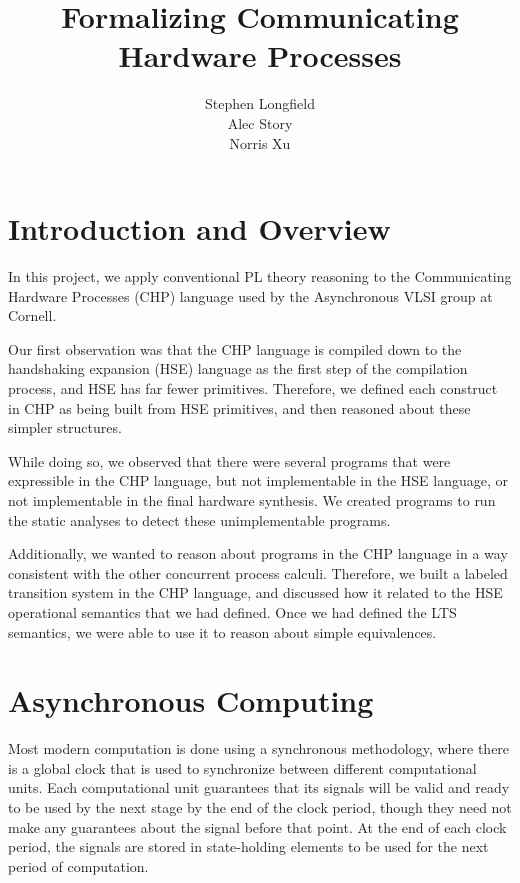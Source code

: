 \documentclass[times, 10pt]{article}
\begin{document}
\title{Formalizing Communicating Hardware Processes}
\author{Stephen Longfield\\Alec Story\\Norris Xu}
\maketitle

\section{Introduction and Overview}

In this project, we apply conventional PL theory reasoning to the Communicating
Hardware Processes (CHP) language used by the Asynchronous VLSI group at
Cornell. 

Our first observation was that the CHP language is compiled down to the
handshaking expansion (HSE) language as the first step of the compilation
process, and HSE has far fewer primitives.  Therefore, we defined each construct
in CHP as being built from HSE primitives, and then reasoned about these simpler
structures.

While doing so, we observed that there were several programs that were
expressible in the CHP language, but not implementable in the HSE language, or
not implementable in the final hardware synthesis. We created programs to run
the static analyses to detect these unimplementable programs.

Additionally, we wanted to reason about programs in the CHP language in a way
consistent with the other concurrent process calculi.  Therefore, we built a
labeled transition system in the CHP language, and discussed how it related to
the HSE operational semantics that we had defined.  Once we had defined the LTS
semantics, we were able to use it to reason about simple equivalences.

\section{Asynchronous Computing}

Most modern computation is done using a synchronous methodology, where there is
a global clock that is used to synchronize between different computational
units.  Each computational unit guarantees that its signals will be valid and
ready to be used by the next stage by the end of the clock period, though they
need not make any guarantees about the signal before that point.  At the end of
each clock period, the signals are stored in state-holding elements to be used
for the next period of computation. 
\end{document}
